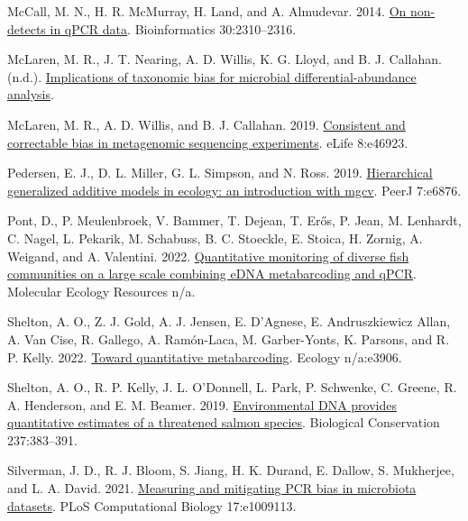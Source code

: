 \documentclass[
]{article}
\newlength{\cslhangindent}
\newlength{\cslentryspacingunit} %
\newenvironment{CSLReferences}[2] %
 {%
  \setlength{\parindent}{0pt}
  \ifodd #1
  \let\oldpar\par
  \def\par{\hangindent=\cslhangindent\oldpar}
  \fi
  \setlength{\parskip}{#2\cslentryspacingunit}
 }%
 {}
\begin{document}
\hypertarget{refs}{}
\begin{CSLReferences}{1}{0}
\leavevmode{}%
McCall, M. N., H. R. McMurray, H. Land, and A. Almudevar. 2014.
\href{https://doi.org/10.1093/bioinformatics/btu239}{On non-detects in
qPCR data}. Bioinformatics 30:2310--2316.

\leavevmode{}%
McLaren, M. R., J. T. Nearing, A. D. Willis, K. G. Lloyd, and B. J.
Callahan. (n.d.).
\href{https://doi.org/10.1101/2022.08.19.504330}{Implications of
taxonomic bias for microbial differential-abundance analysis}.

\leavevmode{}%
McLaren, M. R., A. D. Willis, and B. J. Callahan. 2019.
\href{https://doi.org/10.7554/eLife.46923}{Consistent and correctable
bias in metagenomic sequencing experiments}. eLife 8:e46923.

\leavevmode{}%
Pedersen, E. J., D. L. Miller, G. L. Simpson, and N. Ross. 2019.
\href{https://doi.org/10.7717/peerj.6876}{Hierarchical generalized
additive models in ecology: an introduction with mgcv}. PeerJ 7:e6876.

\leavevmode{}%
Pont, D., P. Meulenbroek, V. Bammer, T. Dejean, T. Erős, P. Jean, M.
Lenhardt, C. Nagel, L. Pekarik, M. Schabuss, B. C. Stoeckle, E. Stoica,
H. Zornig, A. Weigand, and A. Valentini. 2022.
\href{https://doi.org/10.1111/1755-0998.13715}{Quantitative monitoring
of diverse fish communities on a large scale combining eDNA
metabarcoding and qPCR}. Molecular Ecology Resources n/a.

\leavevmode{}%
Shelton, A. O., Z. J. Gold, A. J. Jensen, E. D'Agnese, E. Andruszkiewicz
Allan, A. Van Cise, R. Gallego, A. Ramón-Laca, M. Garber-Yonts, K.
Parsons, and R. P. Kelly. 2022.
\href{https://doi.org/10.1002/ecy.3906}{Toward quantitative
metabarcoding}. Ecology n/a:e3906.

\leavevmode{}%
Shelton, A. O., R. P. Kelly, J. L. O'Donnell, L. Park, P. Schwenke, C.
Greene, R. A. Henderson, and E. M. Beamer. 2019.
\href{https://doi.org/10.1016/j.biocon.2019.07.003}{Environmental DNA
provides quantitative estimates of a threatened salmon species}.
Biological Conservation 237:383--391.

\leavevmode{}%
Silverman, J. D., R. J. Bloom, S. Jiang, H. K. Durand, E. Dallow, S.
Mukherjee, and L. A. David. 2021.
\href{https://doi.org/10.1371/journal.pcbi.1009113}{Measuring and
mitigating PCR bias in microbiota datasets}. PLoS Computational Biology
17:e1009113.

\end{CSLReferences}
\end{document}
